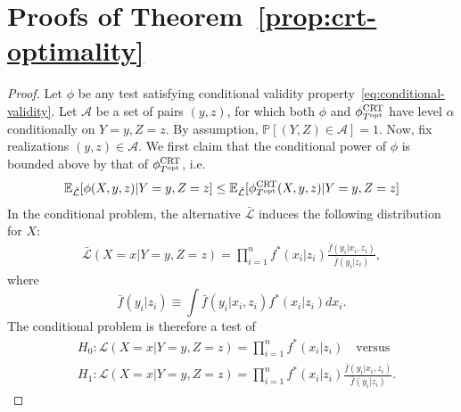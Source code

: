 \documentclass[12pt]{article}
\theoremstyle{definition}
\theoremstyle{remark}
\newcommand{\srx}{X}
\newcommand{\sfx}{x}
\newcommand{\srz}{Z}
\newcommand{\sfz}{z}
\newcommand{\sry}{Y}
\newcommand{\sfy}{y}
\def\CRT{\textnormal{CRT}}
\begin{document}
\printbibliography

\appendix

\section{Proofs of Theorem~\ref{prop:crt-optimality}} \label{sec:proofs-sec2}

\begin{proof}
Let $\phi$ be any test satisfying conditional validity property~\eqref{eq:conditional-validity}. Let $\mathcal A$ be a set of pairs $(\sfy, \sfz)$, for which both $\phi$ and $\phi^{\CRT}_{T^{\textnormal{opt}}}$ have level $\alpha$ conditionally on $\sry = \sfy, \srz = \sfz$. By assumption, $\mathbb P[(\sry, \srz) \in \mathcal A] = 1$. Now, fix realizations $(\sfy, \sfz) \in \mathcal A$. We first claim that the conditional power of $\phi$ is bounded above by that of $\phi^{\CRT}_{T^{\textnormal{opt}}}$, i.e.
	\begin{equation}
		\mathbb E_{\bar{\mathcal L}}[\phi(\srx,\sfy,\sfz)|\sry = \sfy, \srz = \sfz] \leq \mathbb E_{\bar{\mathcal L}}[\phi^{\CRT}_{T^\textnormal{opt}}(\srx, \sfy, \sfz)|\sry = \sfy, \srz = \sfz]
		\label{conditional-optimality}
	\end{equation}
	In the conditional problem, the alternative $\bar{\mathcal L}$ induces the following distribution for $\srx$:
	\begin{equation}
		\begin{split}
			\bar{\mathcal L}(\srx = \sfx|\sry = \sfy, \srz = \sfz) = \prod_{i = 1}^n  f^*(\sfx_i|\sfz_i)\tfrac{\bar f(\sfy_i|\sfx_i, \sfz_i)}{\bar f(\sfy_i|\sfz_i)},
			\label{conditional-alternative}
		\end{split}
	\end{equation}
	where
	\begin{equation*}
	\bar f(\sfy_i|\sfz_i) \equiv \int \bar f(\sfy_i|\sfx_i, \sfz_i)f^*(\sfx_i|\sfz_i)d\sfx_i.
	\end{equation*}	
	The conditional problem is therefore a test of 
	\begin{equation*}
		\begin{split}
			&H_0: \mathcal L(\srx = \sfx|\sry = \sfy, \srz = \sfz) = \prod_{i = 1}^n  f^*(\sfx_i | \sfz_i) \quad \text{versus} \\
			&H_1: \mathcal L(\srx = \sfx|\sry = \sfy, \srz = \sfz) = \prod_{i = 1}^n  f^*(\sfx_i|\sfz_i)\tfrac{\bar f(\sfy_i|\sfx_i, \sfz_i)}{\bar f(\sfy_i|\sfz_i)}.
		\end{split}
	\end{equation*}

\end{proof}
\end{document}
